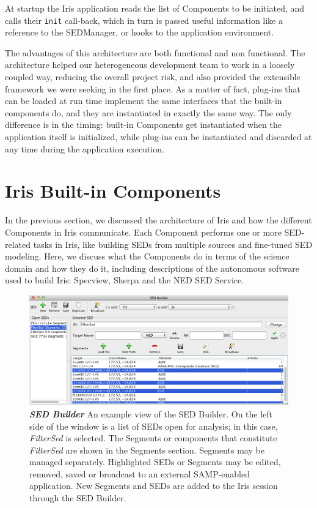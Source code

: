 \documentclass[final,5p,authoryear]{elsarticle}
\begin{document}
At startup the Iris application reads the list of Components to be initiated,
and calls their \texttt{init} call-back, which in turn is passed useful information
like a reference to the SEDManager, or hooks to the application environment.

The advantages of this architecture are both functional and non functional. The architecture
helped our heterogeneous development team to work in a loosely coupled way,
reducing the overall project risk, and also provided the extensible framework
we were seeking in the first place. As a matter of fact, plug-ins that can be
loaded at run time implement the same interfaces that the built-in components
do, and they are instantiated in exactly the same way. The only difference is in
the timing: built-in Components get instantiated when the application itself is
initialized, while plug-ins can be instantiated and discarded at any time during
the application execution.

\section{Iris Built-in Components} \label{sec:components} In the previous
section, we discussed the architecture of Iris and how the different Components
in Iris communicate. Each Component performs one or more SED-related tasks in
Iris, like building SEDs from multiple sources and fine-tuned SED modeling.
Here, we discuss what the Components do in terms of the science domain and how
they do it, including descriptions of the autonomous software used to build
Iris: Specview, Sherpa and the NED SED Service.

\begin{figure} \begin{center}
\includegraphics[width=\textwidth]{figures/sed_builder.png}
\caption{\textit{\textbf{SED Builder}} An example view of the SED Builder. On
the left side of the window is a list of SEDs open for analysis; in this case,
\textit{FilterSed} is selected. The Segments or components that constitute
\textit{FilterSed} are shown in the Segments section. Segments may be managed
separately. Highlighted SEDs or Segments may be edited, removed, saved or
broadcast to an external SAMP-enabled application. New Segments and SEDs are
added to the Iris session through the SED Builder. } \label{fig:sed_builder}
\end{center} \end{figure}
\end{document}
